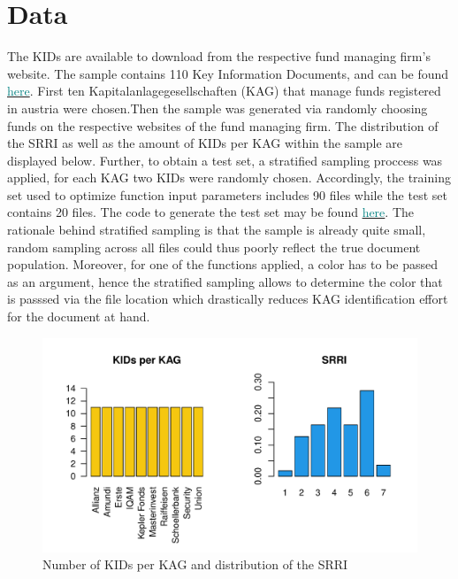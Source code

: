 \documentclass[aodsor,preprint]{imsart}
\numberwithin{equation}{section}
\theoremstyle{plain}
\begin{document}
\section{Data}
The KIDs are available to download from the respective fund managing firm's website. The  sample contains 110 Key Information Documents, and can be found \href{https://github.com/Base-R-Best-R/KID/tree/main/KIDs}{\textcolor{teal}{here}}. First ten Kapitalanlagegesellschaften (KAG) that manage funds registered in austria were chosen.Then the sample was generated via randomly choosing funds on the respective websites of the fund managing firm. The distribution of the SRRI as well as the amount of KIDs per KAG within the sample are displayed below. Further, to obtain a test set, a stratified sampling proccess was applied, for each KAG two KIDs were randomly chosen. Accordingly, the training set used to optimize function input parameters includes 90 files while the test set contains 20 files. The code to generate the test set may be found \href{https://github.com/Base-R-Best-R/KID/blob/main/Code/Package/DEV/Generate_Test_Sample.R}{\textcolor{teal}{here}}. The rationale behind stratified sampling is that the sample is already quite small, random sampling across all files could thus poorly reflect the true document population. Moreover, for one of the functions applied, a color has to be passed as an argument, hence the stratified sampling allows to determine the color that is passsed via the file location which drastically reduces KAG identification effort for the document at hand. 

\begin{figure}[H]
	\includegraphics[width = 12cm]{data_overview.pdf}
	\caption{Number of KIDs per KAG and distribution of the SRRI}
\end{figure}
\end{document}
